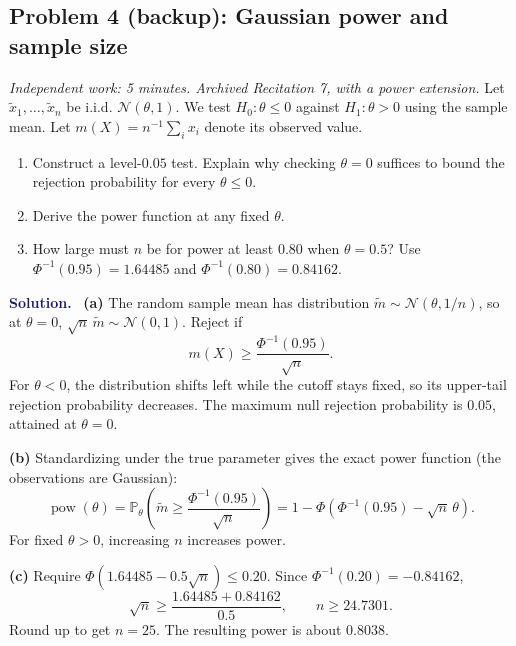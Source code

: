 \documentclass[11pt]{article}
\newif\ifsolutions
\newcommand{\rv}[1]{\widetilde{#1}}
\newcommand{\Pbb}{\mathbb P}
\newcommand{\pow}{\operatorname{pow}}
\newenvironment{answer}{\par\medskip\noindent\textcolor{MidnightBlue}{\textbf{Solution.}}\ }{\par\medskip}
\newcommand{\workingspace}[1]{}
\newcommand{\workingspace}[1]{\vspace{#1}}
\begin{document}
\subsection*{Problem 4 (backup): Gaussian power and sample size}
\noindent\textit{Independent work: 5 minutes. Archived Recitation 7,
with a power extension.}
Let $\rv x_1,\ldots,\rv x_n$ be i.i.d. $\mathcal N(\theta,1)$.
We test $H_0:\theta\leq0$ against $H_1:\theta>0$ using the sample mean.
Let $m(X)=n^{-1}\sum_i x_i$ denote its observed value.
\begin{enumerate}
 \item Construct a level-$0.05$ test. Explain why checking $\theta=0$
 suffices to bound the rejection probability for every $\theta\leq0$.
 \item Derive the power function at any fixed $\theta$.
 \item How large must $n$ be for power at least $0.80$ when
 $\theta=0.5$? Use $\Phi^{-1}(0.95)=1.64485$ and
 $\Phi^{-1}(0.80)=0.84162$.
\end{enumerate}
\workingspace{11cm}
\begin{answer}
\textbf{(a)} The random sample mean has distribution
$\rv m\sim\mathcal N(\theta,1/n)$, so at $\theta=0$,
$\sqrt n\,\rv m\sim\mathcal N(0,1)$. Reject if
\[
 \boxed{m(X)\geq\frac{\Phi^{-1}(0.95)}{\sqrt n}.}
\]
For $\theta<0$, the distribution shifts left while the cutoff stays
fixed, so its upper-tail rejection probability decreases. The maximum
null rejection probability is $0.05$, attained at $\theta=0$.

\textbf{(b)} Standardizing under the true parameter gives the exact power
function (the observations are Gaussian):
\[
 \pow(\theta)=\Pbb_\theta\!\left(\rv m\geq
                          \frac{\Phi^{-1}(0.95)}{\sqrt n}\right)
 =\boxed{1-\Phi\!\left(\Phi^{-1}(0.95)-\sqrt n\,\theta\right).}
\]
For fixed $\theta>0$, increasing $n$ increases power.

\textbf{(c)} Require
$\Phi(1.64485-0.5\sqrt n)\leq0.20$. Since
$\Phi^{-1}(0.20)=-0.84162$,
\[
 \sqrt n\geq\frac{1.64485+0.84162}{0.5},\qquad
 n\geq24.7301.
\]
Round up to get $\boxed{n=25}$.
The resulting power is about $0.8038$.
\end{answer}

\ifsolutions
\newpage
\end{document}
